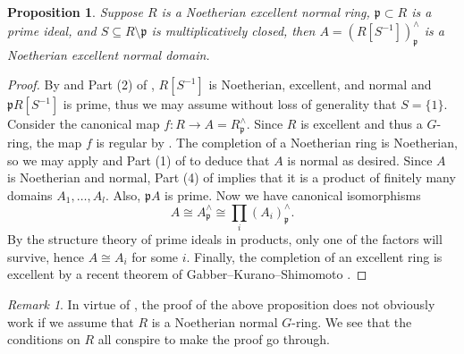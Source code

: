 \documentclass[oneside]{amsart}
\newtheorem{cor}[thm]{Corollary}
\newtheorem{prop}[thm]{Proposition}
\theoremstyle{definition}
\theoremstyle{remark}
\newtheorem{rem}[thm]{Remark}
\theoremstyle{theorem}
\numberwithin{equation}{section}
\newcommand{\fp}{\mathfrak{p}}
\begin{document}
\begin{prop}\label{prop:normal}
Suppose $R$ is a Noetherian excellent normal ring, $\fp \subset R$ is a prime ideal, and $S \subseteq R \setminus \fp$ is multiplicatively closed, then $A = (R[S^{-1}])_{\fp}^{\wedge}$ is a Noetherian excellent normal domain. 
\end{prop}
\begin{proof}
By \cite[Tag 07QU]{stacks-project} and Part (2) of , $R[S^{-1}]$ is Noetherian, excellent, and normal and $\fp R[S^{-1}]$ is prime, thus we may assume without loss of generality that $S = \{1\}$. Consider the canonical map $f\colon R \to A=R_{\fp}^{\wedge}$. Since $R$ is excellent and thus a $G$-ring, the map $f$ is regular by \cite[Tag 0AH2]{stacks-project}. The completion of a Noetherian ring is Noetherian, so we may apply \cite[Tag 0C22]{stacks-project} and Part (1) of  to deduce that $A$ is normal as desired. Since $A$ is Noetherian and normal, Part (4) of  implies that it is a product of finitely many domains $A_1, \ldots, A_l$. Also, $\fp A$ is prime. Now we have canonical isomorphisms
\[
A \cong A^{\wedge}_{\fp} \cong \underset{i}{\prod} (A_i)^{\wedge}_{\fp}.
\]
By the structure theory of prime ideals in products, only one of the factors will survive, hence $A \cong A_i$ for some $i$. Finally, the completion of an excellent ring is excellent by a recent theorem of Gabber--Kurano--Shimomoto \cite{completionexcellent}. 
\end{proof}

\begin{rem}
In virtue of \cite[Tag 07PW]{stacks-project}, the proof of the above proposition does not obviously work if we assume that $R$ is a Noetherian normal $G$-ring. We see that the conditions on $R$ all conspire to make the proof go through.
\end{rem}

\begin{comment}
We won't need this next corollary and the proof is not quite right, you have to use that $A$ is complete somewhere.
\begin{cor}\label{cor:domain}
Let $R$, $S$, and $\fp$ be as in \Cref{prop:normal} and assume additionally that $R[S^{-1}]/\fp$ is connected, then $A$ is a domain. 
\end{cor}
\begin{proof}
By \Cref{prop:normal}, $A$ is normal, so it is a product of normal domains by \Cref{lem:normal}(4). But $A/\fp \cong R[S^{-1}]/\fp$ is connected, so there can be only one factor. 
\end{proof}
\end{comment}
\end{document}
